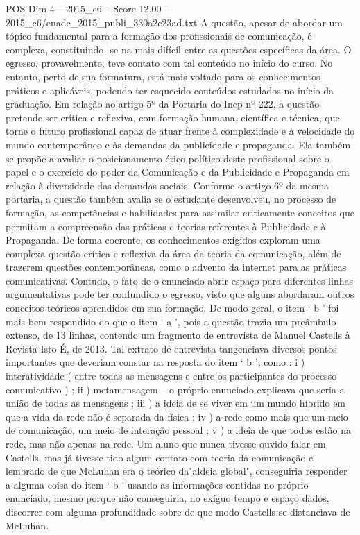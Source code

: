 \begin{textsample}{POS Dim 4 – 2015\_c6 – Score 12.00 – 2015\_c6/enade\_2015\_publi\_330a2c23ad.txt}
A questão, apesar de abordar um tópico fundamental para a formação dos profissionais de comunicação, é complexa, constituindo -se na mais difícil entre as questões específicas da área.
O egresso, provavelmente, teve contato com tal conteúdo no início do curso.
No entanto, perto de sua formatura, está mais voltado para os conhecimentos práticos e aplicáveis, podendo ter esquecido conteúdos estudados no início da graduação.
Em relação ao artigo 5º da Portaria do Inep nº 222, a questão pretende ser crítica e reflexiva, com formação humana, científica e técnica, que torne o futuro profissional capaz de atuar frente à complexidade e à velocidade do mundo contemporâneo e às demandas da publicidade e propaganda.
Ela também se propõe a avaliar o posicionamento ético político deste profissional sobre o papel e o exercício do poder da Comunicação e da Publicidade e Propaganda em relação à diversidade das demandas sociais.
Conforme o artigo 6º da mesma portaria, a questão também avalia se o estudante desenvolveu, no processo de formação, as competências e habilidades para assimilar criticamente conceitos que permitam a compreensão das práticas e teorias referentes à Publicidade e à Propaganda.
De forma coerente, os conhecimentos exigidos exploram uma complexa questão crítica e reflexiva da área da teoria da comunicação, além de trazerem questões contemporâneas, como o advento da internet para as práticas comunicativas.
Contudo, o fato de o enunciado abrir espaço para diferentes linhas argumentativas pode ter confundido o egresso, visto que alguns abordaram outros conceitos teóricos aprendidos em sua formação.
De modo geral, o item ‘ b ’ foi mais bem respondido do que o item ‘ a ’, pois a questão trazia um preâmbulo extenso, de 13 linhas, contendo um fragmento de entrevista de Manuel Castells à Revista Isto É, de 2013.
Tal extrato de entrevista tangenciava diversos pontos importantes que deveriam constar na resposta do item ‘ b ’, como : i ) interatividade ( entre todas as mensagens e entre os participantes do processo comunicativo ) ; ii ) metamensagem – o próprio enunciado explicava que seria a união de todas as mensagens ; iii ) a ideia de se viver em um mundo híbrido em que a vida da rede não é separada da física ; iv ) a rede como mais que um meio de comunicação, um meio de interação pessoal ; v ) a ideia de que todos estão na rede, mas não apenas na rede.
Um aluno que nunca tivesse ouvido falar em Castells, mas já tivesse tido algum contato com teoria da comunicação e lembrado de que McLuhan era o teórico da"aldeia global", conseguiria responder a alguma coisa do item ‘ b ’ usando as informações contidas no próprio enunciado, mesmo porque não conseguiria, no exíguo tempo e espaço dados, discorrer com alguma profundidade sobre de que modo Castells se distanciava de McLuhan.

\end{textsample}
